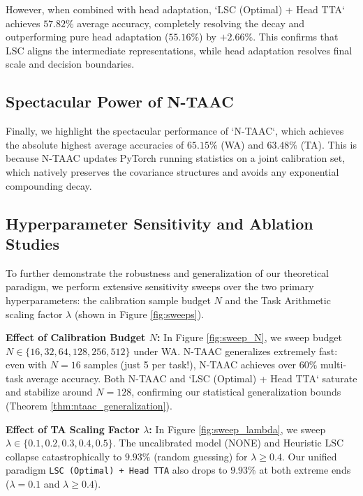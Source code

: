 \documentclass{article}
\theoremstyle{plain}
\theoremstyle{definition}
\theoremstyle{remark}
\begin{document}
However, when combined with head adaptation, `LSC (Optimal) + Head TTA` achieves $57.82\%$ average accuracy, completely resolving the decay and outperforming pure head adaptation ($55.16\%$) by $+2.66\%$. This confirms that LSC aligns the intermediate representations, while head adaptation resolves final scale and decision boundaries.

\subsection{Spectacular Power of N-TAAC}
Finally, we highlight the spectacular performance of `N-TAAC`, which achieves the absolute highest average accuracies of $65.15\%$ (WA) and $63.48\%$ (TA). This is because N-TAAC updates PyTorch running statistics on a joint calibration set, which natively preserves the covariance structures and avoids any exponential compounding decay.

\subsection{Hyperparameter Sensitivity and Ablation Studies}
To further demonstrate the robustness and generalization of our theoretical paradigm, we perform extensive sensitivity sweeps over the two primary hyperparameters: the calibration sample budget $N$ and the Task Arithmetic scaling factor $\lambda$ (shown in Figure \ref{fig:sweeps}).

\textbf{Effect of Calibration Budget $N$:} In Figure \ref{fig:sweep_N}, we sweep budget $N \in \{16, 32, 64, 128, 256, 512\}$ under WA. N-TAAC generalizes extremely fast: even with $N=16$ samples (just 5 per task!), N-TAAC achieves over $60\%$ multi-task average accuracy. Both N-TAAC and `LSC (Optimal) + Head TTA` saturate and stabilize around $N=128$, confirming our statistical generalization bounds (Theorem \ref{thm:ntaac_generalization}).

\textbf{Effect of TA Scaling Factor $\lambda$:} In Figure \ref{fig:sweep_lambda}, we sweep $\lambda \in \{0.1, 0.2, 0.3, 0.4, 0.5\}$. The uncalibrated model (NONE) and Heuristic LSC collapse catastrophically to $9.93\%$ (random guessing) for $\lambda \ge 0.4$. Our unified paradigm \texttt{LSC (Optimal) + Head TTA} also drops to $9.93\%$ at both extreme ends ($\lambda = 0.1$ and $\lambda \ge 0.4$).
\end{document}
